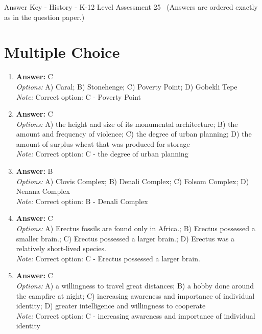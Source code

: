 \documentclass[12pt]{article}
\begin{document}
\begin{center}
Answer Key - History - K-12 Level Assessment 25 \
\small (Answers are ordered exactly as in the question paper.)
\end{center}

\section*{Multiple Choice}
\begin{enumerate}[label=\arabic*.]
\item \textbf{Answer:} C
\\ \textit{Options:} A) Caral; B) Stonehenge; C) Poverty Point; D) Gobekli Tepe
\\ \textit{Note:} Correct option: C - Poverty Point
\item \textbf{Answer:} C
\\ \textit{Options:} A) the height and size of its monumental architecture; B) the amount and frequency of violence; C) the degree of urban planning; D) the amount of surplus wheat that was produced for storage
\\ \textit{Note:} Correct option: C - the degree of urban planning
\item \textbf{Answer:} B
\\ \textit{Options:} A) Clovis Complex; B) Denali Complex; C) Folsom Complex; D) Nenana Complex
\\ \textit{Note:} Correct option: B - Denali Complex
\item \textbf{Answer:} C
\\ \textit{Options:} A) Erectus fossils are found only in Africa.; B) Erectus possessed a smaller brain.; C) Erectus possessed a larger brain.; D) Erectus was a relatively short-lived species.
\\ \textit{Note:} Correct option: C - Erectus possessed a larger brain.
\item \textbf{Answer:} C
\\ \textit{Options:} A) a willingness to travel great distances; B) a hobby done around the campfire at night; C) increasing awareness and importance of individual identity; D) greater intelligence and willingness to cooperate
\\ \textit{Note:} Correct option: C - increasing awareness and importance of individual identity
\end{enumerate}
\end{document}
